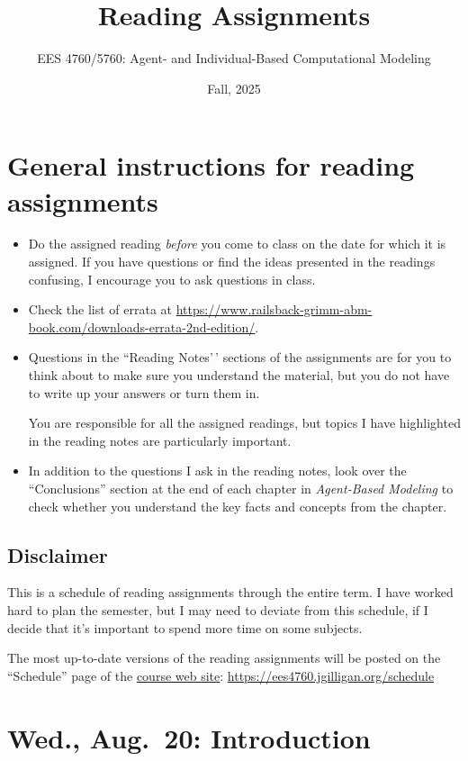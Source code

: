 \documentclass[
]{article}
\title{Reading Assignments}
\author{EES 4760/5760: Agent- and Individual-Based Computational
Modeling}
\date{Fall, 2025}
\begin{document}
\maketitle

\section{General instructions for reading
assignments}\label{general-instructions-for-reading-assignments}

\begin{itemize}
\item
  Do the assigned reading \emph{before\/} you come to class on the date
  for which it is assigned. If you have questions or find the ideas
  presented in the readings confusing, I encourage you to ask questions
  in class.
\item
  Check the list of errata at
  \url{https://www.railsback-grimm-abm-book.com/downloads-errata-2nd-edition/}.
\item
  Questions in the ``Reading Notes'\,' sections of the assignments are
  for you to think about to make sure you understand the material, but
  you do not have to write up your answers or turn them in.

  You are responsible for all the assigned readings, but topics I have
  highlighted in the reading notes are particularly important.
\item
  In addition to the questions I ask in the reading notes, look over the
  ``Conclusions'' section at the end of each chapter in
  \emph{Agent-Based Modeling} to check whether you understand the key
  facts and concepts from the chapter.
\end{itemize}

\subsection{Disclaimer}\label{disclaimer}

This is a schedule of reading assignments through the entire term. I
have worked hard to plan the semester, but I may need to deviate from
this schedule, if I decide that it's important to spend more time on
some subjects.

The most up-to-date versions of the reading assignments will be posted
on the ``Schedule'' page of the
\href{https://ees4760.jgilligan.org/schedule}{course web site}:
\url{https://ees4760.jgilligan.org/schedule}

\section{Wed., Aug.~20: Introduction}\label{wed.-aug.-20-introduction}
\end{document}
